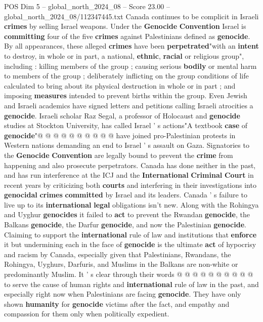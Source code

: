 \begin{textsample}{POS Dim 5 – global\_north\_2024\_08 – Score 23.00 – global\_north\_2024\_08/112347445.txt}
Canada continues to be complicit in Israeli \textbf{crimes} by selling Israel weapons.
Under the \textbf{Genocide} \textbf{Convention} Israel is \textbf{committing} four of the five \textbf{crimes} against Palestinians defined as \textbf{genocide}.
By all appearances, these alleged \textbf{crimes} have been \textbf{perpetrated}"with an \textbf{intent} to destroy, in whole or in part, a national, \textbf{ethnic}, \textbf{racial} or religious group", including : killing members of the group ; causing serious \textbf{bodily} or mental harm to members of the group ; deliberately inflicting on the group conditions of life calculated to bring about its physical destruction in whole or in part ; and imposing \textbf{measures} intended to prevent births within the group.
Even Jewish and Israeli academics have signed letters and petitions calling Israeli atrocities a \textbf{genocide}.
Israeli scholar Raz Segal, a professor of Holocaust and \textbf{genocide} studies at Stockton University, has called Israel ' s actions"A textbook \textbf{case} of \textbf{genocide}"@ @ @ @ @ @ @ @ @ @ have joined pro-Palestinian protests in Western nations demanding an end to Israel ' s assault on Gaza.
Signatories to the \textbf{Genocide} \textbf{Convention} are legally bound to prevent the \textbf{crime} from happening and also prosecute perpetrators.
Canada has done neither in the past, and has run interference at the ICJ and the \textbf{International} \textbf{Criminal} \textbf{Court} in recent years by criticizing both \textbf{courts} and interfering in their investigations into \textbf{genocidal} \textbf{crimes} \textbf{committed} by Israel and its leaders.
Canada ' s failure to live up to its \textbf{international} \textbf{legal} obligations isn't new.
Along with the Rohingya and Uyghur \textbf{genocides} it failed to \textbf{act} to prevent the Rwandan \textbf{genocide}, the Balkans \textbf{genocide}, the Darfur \textbf{genocide}, and now the Palestinian \textbf{genocide}.
Claiming to support the \textbf{international} rule of law and institutions that \textbf{enforce} it but undermining each in the face of \textbf{genocide} is the ultimate \textbf{act} of hypocrisy and racism by Canada, especially given that Palestinians, Rwandans, the Rohingya, Uyghurs, Darfuris, and Muslims in the Balkans are non-white or predominantly Muslim.
It ' s clear through their words @ @ @ @ @ @ @ @ @ @ to serve the cause of human rights and \textbf{international} rule of law in the past, and especially right now when Palestinians are facing \textbf{genocide}.
They have only shown \textbf{humanity} for \textbf{genocide} victims after the fact, and empathy and compassion for them only when politically expedient.

\end{textsample}
